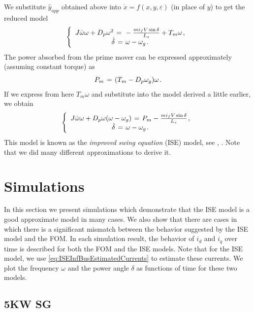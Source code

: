 \documentclass[conference]{IEEEtran}
\renewcommand{\o}    {{\omega}}
\newcommand{\e}      {{\varepsilon}}
\newcommand{\m}      {{\hbox{\hskip 1pt}}}
\begin{document}
We substitute $\hat{y}_{app}$ obtained above into $\dot{x}=f(x,y,\e)$
(in place of $y$) to get the reduced model
$$ \left\{ \begin{array}{c} J\dot{\o}\o+D_p\o^2 \m=\m -\frac{mi_f V
   \sin\delta}{L_s}+T_m\o \m,\\ \dot{\delta} \m=\m \o-\o_g \m.
   \end{array}\right.$$
The power absorbed from the prime mover can be expressed approximately
(assuming constant torque) as
$$P_m \m=\m (T_m-D_p \o_g)\o \m.$$
If we express from here $T_m\o$ and substitute into the model 
derived a little earlier, we obtain
$$ \left\{ \begin{array}{c} J\dot{\o}\o+D_p\o(\o-\o_g) \m=\m P_m - 
   \frac{mi_f V\sin\delta}{L_s} \m,\\ \dot{\delta} \m=\m \o-\o_g \m.
   \end{array}\right.$$
This model is known as the {\em improved swing equation} (ISE) model,
see \cite{DePersiSchaft:16}, \cite{ZhouOhsawa2009}. Note that we did 
many different approximations to derive it.

\section{Simulations}

In this section we present simulations which demonstrate that the ISE
model is a good approximate model in many cases. We also show that
there are cases in which there is a significant mismatch between the
behavior suggested by the ISE model and the FOM. In each simulation
result, the behavior of $i_d$ and $i_q$ over time is described for
both the FOM and the ISE models. Note that for the ISE model, we use
\eqref{eq:ISEInfBusEstimatedCurrents} to estimate these currents. We 
plot the frequency $\o$ and the power angle $\delta$ as functions of
time for these two models.

\subsection{5KW SG}
\end{document}
